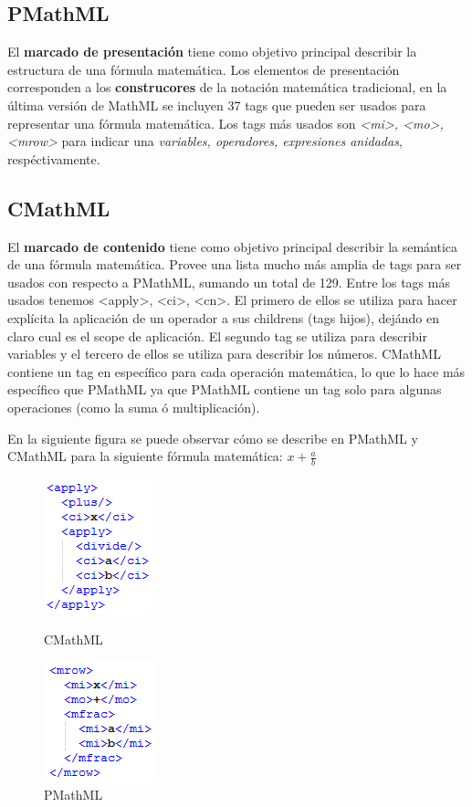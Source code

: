 \subsection{PMathML}

El \textbf{marcado de presentación} tiene como objetivo principal describir la estructura de una fórmula matemática.
Los elementos de presentación corresponden a los \textbf{construcores} de la notación matemática tradicional, en la última versión de MathML se incluyen
37 tags que pueden ser usados para representar una fórmula matemática. Los tags más usados son \textit{<mi>, <mo>, <mrow>} para indicar una \textit{variables, operadores, 
expresiones anidadas}, respéctivamente.

\subsection{CMathML}

El \textbf{marcado de contenido} tiene como objetivo principal describir la semántica de una fórmula matemática.
Provee una lista mucho más amplia de tags para ser usados con respecto a PMathML, sumando un total de 129.
Entre los tags más usados tenemos <apply>, <ci>, <cn>. El primero de ellos se utiliza para hacer explícita la aplicación de un 
operador a sus childrens (tags hijos), dejándo en claro cual es el scope de aplicación. El segundo tag se utiliza para describir variables y el tercero
de ellos se utiliza para describir los números. CMathML contiene un tag en específico para cada operación matemática, lo que lo hace más específico que PMathML
ya que PMathML contiene un tag solo para algunas operaciones (como la suma ó multiplicación).

En la siguiente figura se puede observar cómo se describe en PMathML y CMathML para la siguiente fórmula matemática: $x + \frac{a}{b}$

\begin{figure}[H]
\centering
  \begin{minipage}[b]{0.4\textwidth}
    \includegraphics{Figures/ejemplo_cmathml}
    \caption[]{CMathML}
  \end{minipage}
  \begin{minipage}[b]{0.4\textwidth}
    \includegraphics{Figures/ejemplo_pmathml}
    \caption[]{PMathML}
  \end{minipage}
\label{fig:ejemplo_cmathml}
\end{figure}


